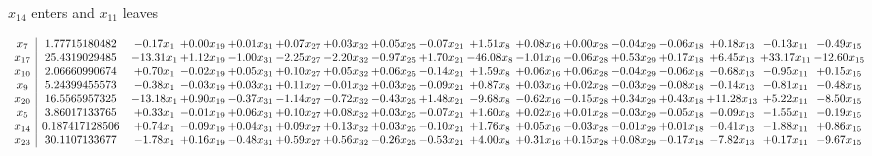 \documentclass[9pt]{article}
\begin{document}
 $ x_{14} $ enters and $ x_{11} $ leaves 

 \[\begin{array}{c| c c@{\hskip 2pt} c@{\hskip 2pt} c@{\hskip 2pt} c@{\hskip 2pt} c@{\hskip 2pt} c@{\hskip 2pt} c@{\hskip 2pt} c@{\hskip 2pt} c@{\hskip 2pt} c@{\hskip 2pt} c@{\hskip 2pt} c@{\hskip 2pt} c@{\hskip 2pt} c@{\hskip 2pt} c@{\hskip 2pt} }
 x_{7}   &  1.77715180482 & -0.17 x_{1} & +  0.00 x_{19} & +  0.01 x_{31} & +  0.07 x_{27} & +  0.03 x_{32} & +  0.05 x_{25} & -0.07 x_{21} & +  1.51 x_{8} & +  0.08 x_{16} & +  0.00 x_{28} & -0.04 x_{29} & -0.06 x_{18} & +  0.18 x_{13} & -0.13 x_{11} & -0.49 x_{15}\\
 x_{17}   &  25.4319029485 & -13.31 x_{1} & +  1.12 x_{19} & -1.00 x_{31} & -2.25 x_{27} & -2.20 x_{32} & -0.97 x_{25} & +  1.70 x_{21} & -46.08 x_{8} & -1.01 x_{16} & -0.06 x_{28} & +  0.53 x_{29} & +  0.17 x_{18} & +  6.45 x_{13} & + 33.17 x_{11} & -12.60 x_{15}\\
 x_{10}   &  2.06660990674 & +  0.70 x_{1} & -0.02 x_{19} & +  0.05 x_{31} & +  0.10 x_{27} & +  0.05 x_{32} & +  0.06 x_{25} & -0.14 x_{21} & +  1.59 x_{8} & +  0.06 x_{16} & +  0.06 x_{28} & -0.04 x_{29} & -0.06 x_{18} & -0.68 x_{13} & -0.95 x_{11} & +  0.15 x_{15}\\
 x_{9}   &  5.24399455573 & -0.38 x_{1} & -0.03 x_{19} & +  0.03 x_{31} & +  0.11 x_{27} & -0.01 x_{32} & +  0.03 x_{25} & -0.09 x_{21} & +  0.87 x_{8} & +  0.03 x_{16} & +  0.02 x_{28} & -0.03 x_{29} & -0.08 x_{18} & -0.14 x_{13} & -0.81 x_{11} & -0.48 x_{15}\\
 x_{20}   &  16.5565957325 & -13.18 x_{1} & +  0.90 x_{19} & -0.37 x_{31} & -1.14 x_{27} & -0.72 x_{32} & -0.43 x_{25} & +  1.48 x_{21} & -9.68 x_{8} & -0.62 x_{16} & -0.15 x_{28} & +  0.34 x_{29} & +  0.43 x_{18} & + 11.28 x_{13} & +  5.22 x_{11} & -8.50 x_{15}\\
 x_{5}   &  3.86017133765 & +  0.33 x_{1} & -0.01 x_{19} & +  0.06 x_{31} & +  0.10 x_{27} & +  0.08 x_{32} & +  0.03 x_{25} & -0.07 x_{21} & +  1.60 x_{8} & +  0.02 x_{16} & +  0.01 x_{28} & -0.03 x_{29} & -0.05 x_{18} & -0.09 x_{13} & -1.55 x_{11} & -0.19 x_{15}\\
 x_{14}   &  0.187417128506 & +  0.74 x_{1} & -0.09 x_{19} & +  0.04 x_{31} & +  0.09 x_{27} & +  0.13 x_{32} & +  0.03 x_{25} & -0.10 x_{21} & +  1.76 x_{8} & +  0.05 x_{16} & -0.03 x_{28} & -0.01 x_{29} & +  0.01 x_{18} & -0.41 x_{13} & -1.88 x_{11} & +  0.86 x_{15}\\
 x_{23}   &  30.1107133677 & -1.78 x_{1} & +  0.16 x_{19} & -0.48 x_{31} & +  0.59 x_{27} & +  0.56 x_{32} & -0.26 x_{25} & -0.53 x_{21} & +  4.00 x_{8} & +  0.31 x_{16} & +  0.15 x_{28} & +  0.08 x_{29} & -0.17 x_{18} & -7.82 x_{13} & +  0.17 x_{11} & -9.67 x_{15}\\

\end{array}\]
\end{document}
